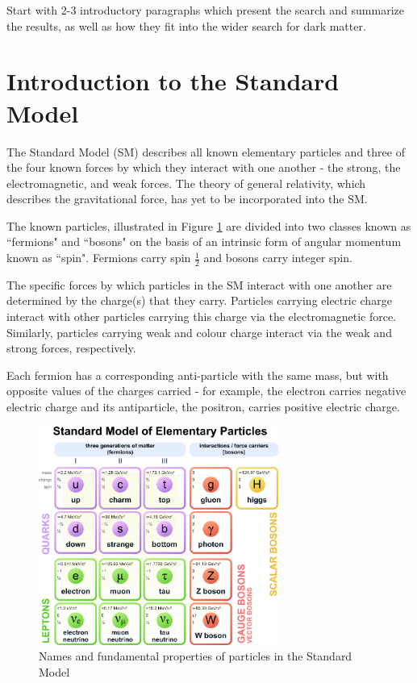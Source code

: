 \label{chapter:introduction}

Start with 2-3 introductory paragraphs which present the search and summarize the results, as well as how they fit into the wider search for dark matter. 

\section{Introduction to the Standard Model}

The Standard Model (SM) describes all known elementary particles and three of the four known forces by which they interact with one another - the strong, the electromagnetic, and weak forces. The theory of general relativity, which describes the gravitational force, has yet to be incorporated into the SM. 

The known particles, illustrated in Figure \ref{fig:standard_model} are divided into two classes known as ``fermions" and ``bosons" on the basis of an intrinsic form of angular momentum known as ``spin". Fermions carry spin \(\frac{1}{2}\) and bosons carry integer spin. 

The specific forces by which particles in the SM interact with one another are determined by the charge(s) that they carry. Particles carrying electric charge interact with other particles carrying this charge via the electromagnetic force. Similarly, particles carrying weak and colour charge interact via the weak and strong forces, respectively. 

Each fermion has a corresponding anti-particle with the same mass, but with opposite values of the charges carried - for example, the electron carries negative electric charge and its antiparticle, the positron, carries positive electric charge. 

\begin{figure}[H]
	\centering
	\includegraphics[width=0.7\textwidth]{Figures/1/StandardModel.pdf}
	\caption[]{Names and fundamental properties of particles in the Standard Model}
	\label{fig:standard_model}
\end{figure}

